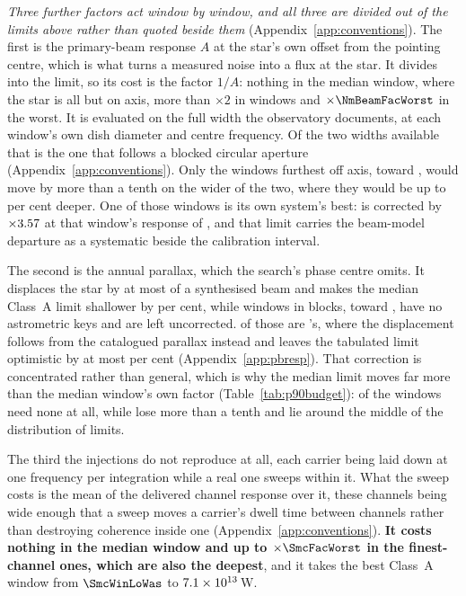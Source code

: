 \emph{Three further factors act window by window, and all three are divided
out of the limits above rather than quoted beside them}
(Appendix~\ref{app:conventions}). The first is the primary-beam response
$A$ at the star's own offset from the pointing centre, which is what turns a
measured noise into a flux at the star. It divides into the limit, so its
cost is the factor $1/A$: nothing in the median window, where the star is all
but on axis, more than $\times2$ in \NmBeamNFacTwo{} windows and
$\times\NmBeamFacWorst$ in the worst. It is evaluated on the full width the
observatory documents, at each window's own dish diameter and centre
frequency. Of the two widths available that is the one that follows a blocked
circular aperture (Appendix~\ref{app:conventions}). Only the
\BmNAboveTenPct{} windows furthest off axis, toward \BnStarList, would move
by more than a tenth on the wider of the two, where they would be up to
\BmShiftMaxPct{} per cent deeper. One of those windows is its own system's
best: \BnBestSys{} is corrected by $\times3.57$ at that window's
response of \BnBestResp, and that limit carries the beam-model departure as a
systematic beside the calibration interval.

The second is the annual parallax, which the search's phase centre omits. It
displaces the star by at most \SensBeamsMax{} of a synthesised beam and makes
the median Class~A limit shallower by \PxaShiftWinPct{} per cent, while
\PxaNMissing{} windows in \PxaNMissingEb{} blocks, toward
\PxaMissingStars, have no astrometric keys and are left uncorrected.
\PxaNMissingTop{} of those are \PxaMissingTopStar's, where the displacement
follows from the catalogued parallax instead and leaves the tabulated limit
optimistic by at most \BmEpsPxBoundPct{} per cent
(Appendix~\ref{app:pbresp}). That correction is concentrated rather than general, which is
why the median limit moves far more than the median window's own factor
(Table~\ref{tab:p90budget}): \RpPxNNone{} of the \NWinA{} windows need none
at all, while \RpPxNBig{} lose more than a tenth and lie around the middle of
the distribution of limits.

The third the injections do not reproduce at all, each carrier being laid
down at one frequency per integration while a real one sweeps within it. What
the sweep costs is the mean of the delivered channel response over it, these
channels being wide enough that a sweep moves a carrier's dwell time between
channels rather than destroying coherence inside one
(Appendix~\ref{app:conventions}). \textbf{It costs nothing in the median
window and up to $\times\SmcFacWorst$ in the \SmcNAbove{} finest-channel
ones, which are also the deepest}, and it takes the best Class~A window from
$\SmcWinLoWas$ to $7.1\times10^{13}$\,W.

